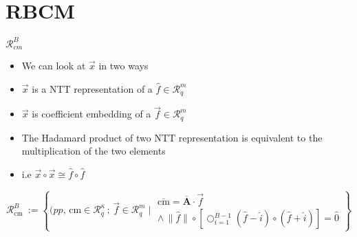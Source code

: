 \section{RBCM}
\begin{frame}{$\mathcal{R}^{B}_{cm}$ }
    \begin{itemize}
        \item We can look at $\overrightarrow{x}$ in two ways
        \item $\overrightarrow{x}$ is a NTT representation of a $\hat{f} \in \mathcal{R}^m_q$
        \item  $\overrightarrow{x}$ is coefficient embedding of a $\overrightarrow{f} \in \mathcal{R}^m_q$
        \item The Hadamard product of two NTT representation is equivalent to the multiplication of the two elements
        \item i.e $\overrightarrow{x} \circ \overrightarrow{x} \cong \hat{f} \circ \hat{f}$
    \end{itemize}
    \[
        \mathcal{R}^B_{\text{cm }} :=
        \left\{ (pp, \, \text{cm} \in \mathcal{R}^{\kappa}_q\, ;\, \overrightarrow{f}  \in \mathcal{R}^{m}_q \mid
        \begin{array}{c}
            \overline{\text{cm}} = \overline{\mathbf{A}} \cdot \overrightarrow{f} \\
            \land \, \| \hat{f} \| \circ \left[\bigcirc^{B-1}_{i=1} (\hat{f} - \hat{i}) \circ (\hat{f} + \hat{i}) \right] = \hat{0}
        \end{array}
        \right\}
    \]
\end{frame}